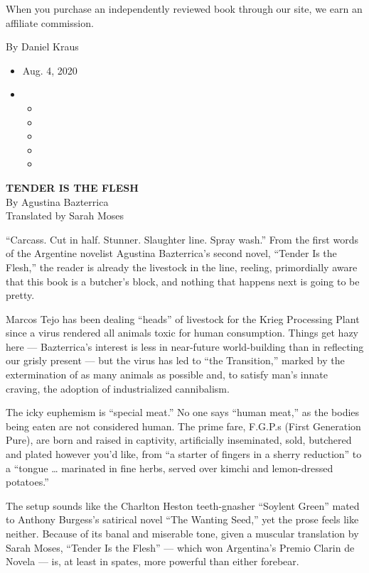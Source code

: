 When you purchase an independently reviewed book through our site, we
earn an affiliate commission.

By Daniel Kraus

\begin{itemize}
\item
  Aug. 4, 2020
\item
  \begin{itemize}
  \item
  \item
  \item
  \item
  \item
  \end{itemize}
\end{itemize}

\textbf{TENDER IS THE FLESH}\\
By Agustina Bazterrica\\
Translated by Sarah Moses

``Carcass. Cut in half. Stunner. Slaughter line. Spray wash.'' From the
first words of the Argentine novelist Agustina Bazterrica's second
novel, ``Tender Is the Flesh,'' the reader is already the livestock in
the line, reeling, primordially aware that this book is a butcher's
block, and nothing that happens next is going to be pretty.

Marcos Tejo has been dealing ``heads'' of livestock for the Krieg
Processing Plant since a virus rendered all animals toxic for human
consumption. Things get hazy here --- Bazterrica's interest is less in
near-future world-building than in reflecting our grisly present --- but
the virus has led to ``the Transition,'' marked by the extermination of
as many animals as possible and, to satisfy man's innate craving, the
adoption of industrialized cannibalism.

The icky euphemism is ``special meat.'' No one says ``human meat,'' as
the bodies being eaten are not considered human. The prime fare, F.G.P.s
(First Generation Pure), are born and raised in captivity, artificially
inseminated, sold, butchered and plated however you'd like, from ``a
starter of fingers in a sherry reduction'' to a ``tongue \ldots{}
marinated in fine herbs, served over kimchi and lemon-dressed
potatoes.''

The setup sounds like the Charlton Heston teeth-gnasher ``Soylent
Green'' mated to Anthony Burgess's satirical novel ``The Wanting Seed,''
yet the prose feels like neither. Because of its banal and miserable
tone, given a muscular translation by Sarah Moses, ``Tender Is the
Flesh'' --- which won Argentina's Premio Clarin de Novela --- is, at
least in spates, more powerful than either forebear.

